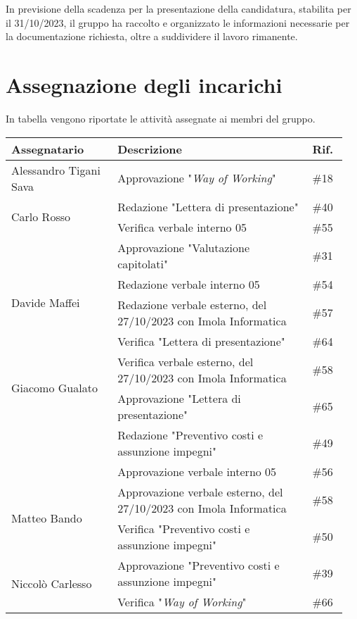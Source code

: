 \noindent 
In previsione della scadenza per la presentazione della candidatura, stabilita per il 31/10/2023, il gruppo ha raccolto e organizzato le informazioni necessarie per la documentazione richiesta, oltre a suddividere il lavoro rimanente.


\section{Assegnazione degli incarichi}
In tabella vengono riportate le attività assegnate ai membri del gruppo.
\begin{center}
    {
    \renewcommand{\arraystretch}{1.5}
    \begin{tabular}{p{0.30\linewidth}|p{0.55\linewidth}|p{0.10\linewidth}}
		\textbf{Assegnatario}   		&   \textbf{Descrizione}   & \textbf{Rif.}     \\
		\hline
		Alessandro Tigani Sava  		&	Approvazione "\textit{Way of Working}"					& \#18 	\\
		\hline
		\multirow{2}{*}{Carlo Rosso}	&	Redazione "Lettera di presentazione"					& \#40 	\\
		\cline{2-3}
										&	Verifica verbale interno 05								& \#55 	\\
		\cline{2-3}
										&	Approvazione "Valutazione capitolati"					& \#31 	\\
		\hline
		\multirow{2}{*}{Davide Maffei}	&   Redazione verbale interno 05							& \#54 	\\
		\cline{2-3}
										&	Redazione verbale esterno, del 27/10/2023 con Imola Informatica & \#57 	\\
        \cline{2-3}
										&	Verifica "Lettera di presentazione"						& \#64 	\\
		\hline
		\multirow{2}{*}{Giacomo Gualato}					
										&	Verifica verbale esterno, del 27/10/2023 con Imola Informatica & \#58 	\\
        \cline{2-3}
										&	Approvazione "Lettera di presentazione"					& \#65 	\\
        \cline{2-3}                                                                             	
										&	Redazione "Preventivo costi e assunzione impegni"		& \#49 	\\
        \cline{2-3}                                                                             	
										&	Approvazione verbale interno 05							& \#56 	\\
		\hline
		\multirow{2}{*}{Matteo Bando}	&	Approvazione verbale esterno, del 27/10/2023 con Imola Informatica & \#58 	\\
		\cline{2-3}
										&	Verifica "Preventivo costi e assunzione impegni"		& \#50 	\\
		\hline
		\multirow{2}{*}{Niccolò Carlesso}				
										&	Approvazione "Preventivo costi e assunzione impegni"	& \#39 	\\
        \cline{2-3}
										&	Verifica "\textit{Way of Working}"						& \#66 	\\
    \end{tabular}
    }
\end{center}
